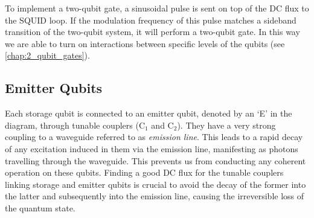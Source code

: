 To implement a two-qubit gate, a sinusoidal pulse is sent on top of the DC flux to the SQUID loop. If the modulation frequency of this pulse matches a sideband transition of the two-qubit system, it will perform a two-qubit gate.
In this way we are able to turn on interactions between specific levels of the qubits (see \cref{chap:2_qubit_gates}).

\subsection{Emitter Qubits}
Each storage qubit is connected to an emitter qubit, denoted by an ‘E' in the diagram, through tunable couplers ($\text{C}_1$ and $\text{C}_2$).
They have a very strong coupling to a waveguide referred to as \emph{emission line}.
This leads to a rapid decay of any excitation induced in them via the emission line, manifesting as photons travelling through the waveguide.
This prevents us from conducting any coherent operation on these qubits.
Finding a good DC flux for the tunable couplers linking storage and emitter qubits is crucial to avoid the decay of the former into the latter and subsequently into the emission line, causing the irreversible loss of the quantum state.
